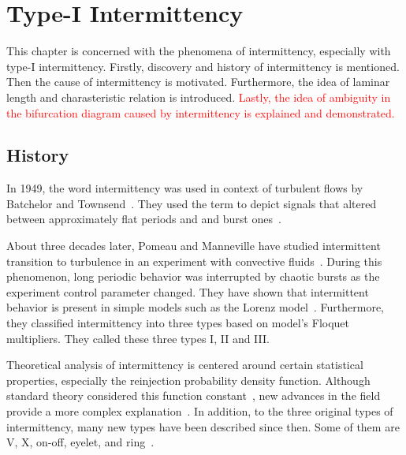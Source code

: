 \chapter{Type-I Intermittency}
\label{chap:type-I intermittency}

This chapter is concerned with the phenomena of intermittency, especially with type-I intermittency.
Firstly, discovery and history of intermittency is mentioned.
Then the cause of intermittency is motivated.
Furthermore, the idea of laminar length and charasteristic relation is introduced.
\textcolor{red}{Lastly, the idea of ambiguity in the bifurcation diagram caused by intermittency is explained and demonstrated.}

\section{History}
In 1949, the word intermittency was used in context of turbulent flows by Batchelor and Townsend~\cite{Batchelor19491025}.
They used the term to depict signals that altered between approximately flat periods and and burst ones~\cite{Elaskar2017}.
\par
About three decades later, Pomeau and Manneville have studied intermittent transition to turbulence in an experiment with convective fluids~\cite{Pomeau1980}.
During this phenomenon, long periodic behavior was interrupted by chaotic bursts as the experiment control parameter changed.
They have shown that intermittent behavior is present in simple models such as the Lorenz model~\cite{Lorenz2004}.
Furthermore, they classified intermittency into three types based on model's Floquet multipliers.
They called these three types I, II and III.
\par
Theoretical analysis of intermittency is centered around certain statistical properties, especially the reinjection probability density function.
Although standard theory considered this function constant~\cite{Dubois1983}, new advances in the field provide a more complex explanation~\cite{Elaskar2022}.
In addition, to the three original types of intermittency, many new types have been described since then.
Some of them are V, X, on-off, eyelet, and ring~\cite{Elaskar2022}.

